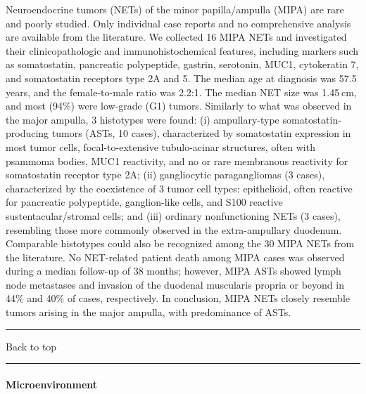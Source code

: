 \documentclass[]{article}
\let\oldparagraph\paragraph
\renewcommand{\paragraph}[1]{\oldparagraph{#1}\mbox{}}
\begin{document}
Neuroendocrine tumors (NETs) of the minor papilla/ampulla (MIPA) are
rare and poorly studied. Only individual case reports and no
comprehensive analysis are available from the literature. We collected
16 MIPA NETs and investigated their clinicopathologic and
immunohistochemical features, including markers such as somatostatin,
pancreatic polypeptide, gastrin, serotonin, MUC1, cytokeratin 7, and
somatostatin receptors type 2A and 5. The median age at diagnosis was
57.5 years, and the female-to-male ratio was 2.2:1. The median NET size
was 1.45 cm, and most (94\%) were low-grade (G1) tumors. Similarly to
what was observed in the major ampulla, 3 histotypes were found: (i)
ampullary-type somatostatin-producing tumors (ASTs, 10 cases),
characterized by somatostatin expression in most tumor cells,
focal-to-extensive tubulo-acinar structures, often with psammoma bodies,
MUC1 reactivity, and no or rare membranous reactivity for somatostatin
receptor type 2A; (ii) gangliocytic paragangliomas (3 cases),
characterized by the coexistence of 3 tumor cell types: epithelioid,
often reactive for pancreatic polypeptide, ganglion-like cells, and S100
reactive sustentacular/stromal cells; and (iii) ordinary nonfunctioning
NETs (3 cases), resembling those more commonly observed in the
extra-ampullary duodenum. Comparable histotypes could also be recognized
among the 30 MIPA NETs from the literature. No NET-related patient death
among MIPA cases was observed during a median follow-up of 38 months;
however, MIPA ASTs showed lymph node metastases and invasion of the
duodenal muscularis propria or beyond in 44\% and 40\% of cases,
respectively. In conclusion, MIPA NETs closely resemble tumors arising
in the major ampulla, with predominance of ASTs.

{}

{}

\begin{center}\rule{0.5\linewidth}{\linethickness}\end{center}

Back to top

\begin{center}\rule{0.5\linewidth}{\linethickness}\end{center}

\pagebreak

\hypertarget{microenvironment-1}{%
\paragraph{Microenvironment}\label{microenvironment-1}}
\end{document}
